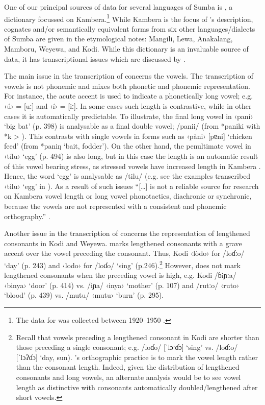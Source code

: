 One of our principal sources of data for several languages of
Sumba is \citet{Onvlee1984}, a dictionary focussed on Kambera.\footnote{
		The data for \citet{Onvlee1984}
		was collected between 1920--1950 \citep[259]{Klamer2009}.}
While Kambera
is the focus of \citeauthor{Onvlee1984}’s description,
cognates and/or semantically equivalent forms from six other
languages/dialects of Sumba are given in the etymological notes:
Mangili, Lewa, Anakalang, Mamboru, Weyewa, and Kodi.
While this dictionary is an invaluable source of data,
it has transcriptional issues which are discussed by \citet{Klamer2009}.

The main issue in the transcription of \citet{Onvlee1984} concerns the vowels.
The transcription of vowels is not phonemic
and mixes both phonetic and phonemic representation.
For instance, the acute accent is used to indicate a phonetically long vowel; e.g.
‹ú› = [uː] and ‹í› = [iː].
In some cases such length is contrastive,
while in other cases it is automatically predictable.
To illustrate, the final long vowel in ‹paní› ‘big bat’ (p.
398) is analysable as a final double vowel; /panii/ (from *paniki
with *k > {\0}).
This contrasts with single vowels in forms such as ‹pàni›
[pɐni] ‘chicken feed’ (from *paniŋ ‘bait, fodder’).
On the other hand,
the penultimate vowel in ‹tílu› ‘egg’ (p. 494) is also long,
but in this case the length is an automatic result of this vowel
bearing stress, as stressed vowels have increased length in Kambera \citep[252]{Klamer2009}.
Hence, the word ‘egg’ is analysable as /tilu/ (e.g.
see the examples transcribed ‹tilu› ‘egg’ in \citealp[148, 207]{Klamer1998a}).
As a result of such issues “[{\ldots}] \citet{Onvlee1984} is
not a reliable source for research on Kambera vowel length or
long vowel phonotactics, diachronic or synchronic, because the vowels are not represented
with a consistent and phonemic orthography.” \citep[253]{Klamer2009}.

Another issue in the transcription of \citet{Onvlee1984} concerns
the representation of lengthened consonants in Kodi and Weyewa.
\citeauthor{Onvlee1984} marks lengthened consonants with a grave accent over the
vowel preceding the consonant.
Thus, Kodi ‹lòdo› for /loɗːo/ ‘day’ (p.
243) and ‹lodo› for /loɗo/ ‘sing’ (p.246).\footnote{
		Recall that vowels preceding a lengthened consonant in Kodi are shorter
		than those preceding a single consonant; e.g.
		/loɗo/ [ˈlɔˑɗɔ] ‘sing’ vs.
		/loɗːo/ [ˈlɔʔɗɔ] ‘day, sun).
		\citeauthor{Onvlee1984}’s orthographic practice is to mark the vowel length
		rather than the consonant length.
		Indeed, given the distribution of
		lengthened consonants and long vowels,
		an alternate analysis would be to see vowel length as distinctive
		with consonants automatically doubled/lengthened after short vowels.}
However, \citeauthor{Onvlee1984} does not mark
lengthened consonants when the preceding vowel is high,
e.g. Kodi /ɓiɲːa/ ‹binya› ‘door’ (p. 414) vs.
/iɲa/ ‹inya› ‘mother’ (p.
107) and /rutːo/ ‹ruto› ‘blood’ (p. 439) vs.
/mutu/ ‹mutu› ‘burn’ (p. 295).

